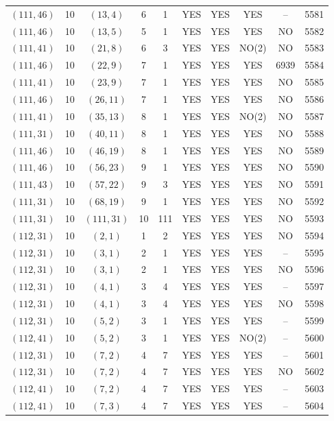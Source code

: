 \begin{longtable}{|c|c|c|c|c|c|c|c|c|c|}
$(111, 46)$ & 10 & $(13, 4)$ & 6 & 1 & YES & YES & YES & -- & 5581\\
$(111, 46)$ & 10 & $(13, 5)$ & 5 & 1 & YES & YES & YES & NO & 5582\\
$(111, 41)$ & 10 & $(21, 8)$ & 6 & 3 & YES & YES & NO(2) & NO & 5583\\
$(111, 46)$ & 10 & $(22, 9)$ & 7 & 1 & YES & YES & YES & 6939 & 5584\\
$(111, 41)$ & 10 & $(23, 9)$ & 7 & 1 & YES & YES & YES & NO & 5585\\
$(111, 46)$ & 10 & $(26, 11)$ & 7 & 1 & YES & YES & YES & NO & 5586\\
$(111, 41)$ & 10 & $(35, 13)$ & 8 & 1 & YES & YES & NO(2) & NO & 5587\\
$(111, 31)$ & 10 & $(40, 11)$ & 8 & 1 & YES & YES & YES & NO & 5588\\
$(111, 46)$ & 10 & $(46, 19)$ & 8 & 1 & YES & YES & YES & NO & 5589\\
$(111, 46)$ & 10 & $(56, 23)$ & 9 & 1 & YES & YES & YES & NO & 5590\\
$(111, 43)$ & 10 & $(57, 22)$ & 9 & 3 & YES & YES & YES & NO & 5591\\
$(111, 31)$ & 10 & $(68, 19)$ & 9 & 1 & YES & YES & YES & NO & 5592\\
$(111, 31)$ & 10 & $(111, 31)$ & 10 & 111 & YES & YES & YES & NO & 5593\\
$(112, 31)$ & 10 & $(2, 1)$ & 1 & 2 & YES & YES & YES & NO & 5594\\
$(112, 31)$ & 10 & $(3, 1)$ & 2 & 1 & YES & YES & YES & -- & 5595\\
$(112, 31)$ & 10 & $(3, 1)$ & 2 & 1 & YES & YES & YES & NO & 5596\\
$(112, 31)$ & 10 & $(4, 1)$ & 3 & 4 & YES & YES & YES & -- & 5597\\
$(112, 31)$ & 10 & $(4, 1)$ & 3 & 4 & YES & YES & YES & NO & 5598\\
$(112, 31)$ & 10 & $(5, 2)$ & 3 & 1 & YES & YES & YES & -- & 5599\\
$(112, 41)$ & 10 & $(5, 2)$ & 3 & 1 & YES & YES & NO(2) & -- & 5600\\
$(112, 31)$ & 10 & $(7, 2)$ & 4 & 7 & YES & YES & YES & -- & 5601\\
$(112, 31)$ & 10 & $(7, 2)$ & 4 & 7 & YES & YES & YES & NO & 5602\\
$(112, 41)$ & 10 & $(7, 2)$ & 4 & 7 & YES & YES & YES & -- & 5603\\
$(112, 41)$ & 10 & $(7, 3)$ & 4 & 7 & YES & YES & YES & -- & 5604\\

\end{longtable}
